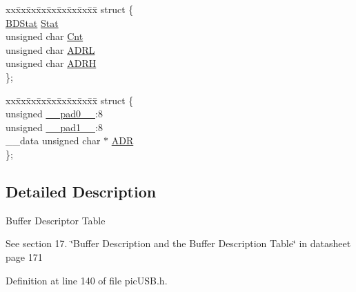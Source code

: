 \begin{DoxyCompactItemize}
\begin{tabbing}
\end{tabbing}\item 
\begin{tabbing}
xx\=xx\=xx\=xx\=xx\=xx\=xx\=xx\=xx\=\kill
struct \{\\
\>\hyperlink{union_b_d_stat}{BDStat} \hyperlink{union_buffer_descriptor_table_a6cd0cf5f5c11f77a2597bd70e392b4b8}{Stat}\\
\>unsigned char \hyperlink{union_buffer_descriptor_table_a993db247f4d91af55d6e7d23e79af388}{Cnt}\\
\>unsigned char \hyperlink{union_buffer_descriptor_table_ac844d9c6a5693226cd0a118457f1136b}{ADRL}\\
\>unsigned char \hyperlink{union_buffer_descriptor_table_a88fd75c8c3e937291a788423a7958b8d}{ADRH}\\
\}; \\

\end{tabbing}\item 
\begin{tabbing}
xx\=xx\=xx\=xx\=xx\=xx\=xx\=xx\=xx\=\kill
struct \{\\
\>unsigned \hyperlink{union_buffer_descriptor_table_adf71f3d8410c1f1dbbc96680a92c49af}{\_\_pad0\_\_}:8\\
\>unsigned \hyperlink{union_buffer_descriptor_table_acaf2d0924a107ec6e8d2e31febaf66f9}{\_\_pad1\_\_}:8\\
\>\_\_data unsigned char $\ast$ \hyperlink{union_buffer_descriptor_table_af9ea67355f60478b33f33e36a1fde262}{ADR}\\
\}; \\

\end{tabbing}\end{DoxyCompactItemize}


\subsection{Detailed Description}
Buffer Descriptor Table\par
 See section 17. \char`\"{}\-Buffer Description and the Buffer Description Table\char`\"{} in datasheet page 171 

Definition at line 140 of file pic\-U\-S\-B.\-h.



